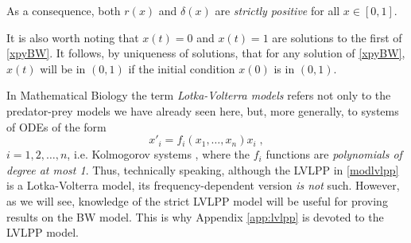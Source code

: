 \documentclass[12pt]{article}
\theoremstyle{definition}
\begin{document}
As a consequence, both $r(x)$ and $\delta(x)$ are \emph{strictly positive} for all $x \in[0,1]$.

It is also worth noting that $x(t)=0$ and $x(t)=1$ are solutions to the first of \eqref{xpyBW}. It follows, by uniqueness of solutions, that for any solution of \eqref{xpyBW}, $x(t)$ will be in $(0,1)$ if the initial condition $x(0)$ is in $(0,1)$.

In Mathematical Biology the term \emph{Lotka-Volterra models} refers not only to the predator-prey models we have already seen here, but, more generally, to systems of ODEs of the form
\[x'_i = f_i(x_1, \dots,  x_n) x_i\;,\]
$i=1, 2, \dots, n$, i.e. Kolmogorov systems \cite{frewal}, where the $f_i$ functions are \emph{polynomials of degree at most 1}. Thus, technically speaking, although the LVLPP in \eqref{modlvlpp} is a Lotka-Volterra model, its frequency-dependent version \emph{is not} such. However, as we will see, knowledge of the strict LVLPP model will be useful for proving results on the BW model. This is why Appendix \ref{app:lvlpp} is devoted to the LVLPP model.
\end{document}
